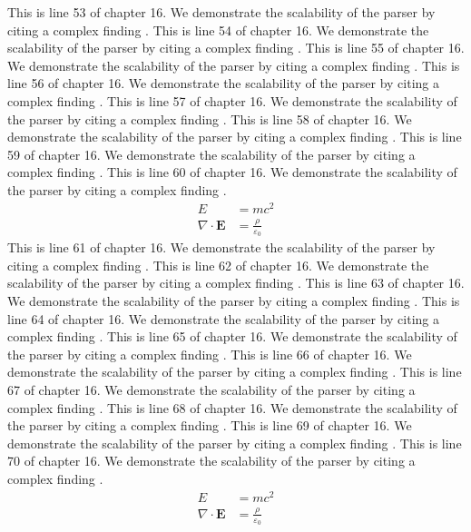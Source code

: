 This is line 53 of chapter 16. We demonstrate the scalability of the parser by citing a complex finding \cite{ref16_53}.
This is line 54 of chapter 16. We demonstrate the scalability of the parser by citing a complex finding \cite{ref16_54}.
This is line 55 of chapter 16. We demonstrate the scalability of the parser by citing a complex finding \cite{ref16_55}.
This is line 56 of chapter 16. We demonstrate the scalability of the parser by citing a complex finding \cite{ref16_56}.
This is line 57 of chapter 16. We demonstrate the scalability of the parser by citing a complex finding \cite{ref16_57}.
This is line 58 of chapter 16. We demonstrate the scalability of the parser by citing a complex finding \cite{ref16_58}.
This is line 59 of chapter 16. We demonstrate the scalability of the parser by citing a complex finding \cite{ref16_59}.
This is line 60 of chapter 16. We demonstrate the scalability of the parser by citing a complex finding \cite{ref16_60}.
\begin{align*}
  E &= mc^2 \\
  \nabla \cdot \mathbf{E} &= \frac{\rho}{\varepsilon_0}
\end{align*}
This is line 61 of chapter 16. We demonstrate the scalability of the parser by citing a complex finding \cite{ref16_61}.
This is line 62 of chapter 16. We demonstrate the scalability of the parser by citing a complex finding \cite{ref16_62}.
This is line 63 of chapter 16. We demonstrate the scalability of the parser by citing a complex finding \cite{ref16_63}.
This is line 64 of chapter 16. We demonstrate the scalability of the parser by citing a complex finding \cite{ref16_64}.
This is line 65 of chapter 16. We demonstrate the scalability of the parser by citing a complex finding \cite{ref16_65}.
This is line 66 of chapter 16. We demonstrate the scalability of the parser by citing a complex finding \cite{ref16_66}.
This is line 67 of chapter 16. We demonstrate the scalability of the parser by citing a complex finding \cite{ref16_67}.
This is line 68 of chapter 16. We demonstrate the scalability of the parser by citing a complex finding \cite{ref16_68}.
This is line 69 of chapter 16. We demonstrate the scalability of the parser by citing a complex finding \cite{ref16_69}.
This is line 70 of chapter 16. We demonstrate the scalability of the parser by citing a complex finding \cite{ref16_70}.
\begin{align*}
  E &= mc^2 \\
  \nabla \cdot \mathbf{E} &= \frac{\rho}{\varepsilon_0}
\end{align*}
